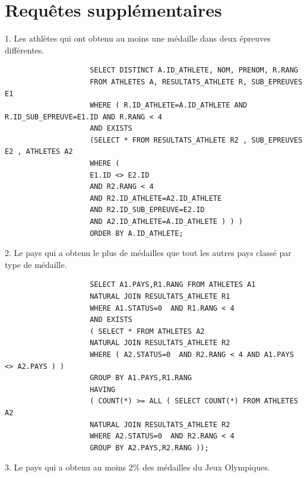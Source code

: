 \documentclass[]{scrreprt}
\begin{document}
			\newpage
			
		\section{Requêtes supplémentaires}
			
			{\large 
				1. Les athlètes qui ont obtenu au moins une médaille dans deux épreuves différentes.
				
			}
			
			{\footnotesize 
				\begin{tcolorbox}
					\begin{verbatim}
					SELECT DISTINCT A.ID_ATHLETE, NOM, PRENOM, R.RANG
					FROM ATHLETES A, RESULTATS_ATHLETE R, SUB_EPREUVES E1
					WHERE ( R.ID_ATHLETE=A.ID_ATHLETE AND R.ID_SUB_EPREUVE=E1.ID AND R.RANG < 4
					AND EXISTS
					(SELECT * FROM RESULTATS_ATHLETE R2 , SUB_EPREUVES E2 , ATHLETES A2
					WHERE (
					E1.ID <> E2.ID
					AND R2.RANG < 4
					AND R2.ID_ATHLETE=A2.ID_ATHLETE
					AND R2.ID_SUB_EPREUVE=E2.ID
					AND A2.ID_ATHLETE=A.ID_ATHLETE ) ) )
					ORDER BY A.ID_ATHLETE;
					\end{verbatim}
				\end{tcolorbox}
			}
			
			\vspace{0.5cm}
			
			{\large 
				2. Le pays qui a obtenu le plus de médailles que tout les autres pays classé par type de médaille.
				
			}
			
			{\footnotesize 
				\begin{tcolorbox}
					\begin{verbatim}
					SELECT A1.PAYS,R1.RANG FROM ATHLETES A1
					NATURAL JOIN RESULTATS_ATHLETE R1
					WHERE A1.STATUS=0  AND R1.RANG < 4
					AND EXISTS
					( SELECT * FROM ATHLETES A2
					NATURAL JOIN RESULTATS_ATHLETE R2
					WHERE ( A2.STATUS=0  AND R2.RANG < 4 AND A1.PAYS <> A2.PAYS ) )
					GROUP BY A1.PAYS,R1.RANG
					HAVING
					( COUNT(*) >= ALL ( SELECT COUNT(*) FROM ATHLETES A2
					NATURAL JOIN RESULTATS_ATHLETE R2
					WHERE A2.STATUS=0  AND R2.RANG < 4
					GROUP BY A2.PAYS,R2.RANG ));	
					\end{verbatim}
				\end{tcolorbox}
			}
			
			\vspace{0.5cm}
			
			{\large 
				3. Le pays qui a obtenu au moins 2\% des médailles du Jeux Olympiques.
				
			}
			
\end{document}
